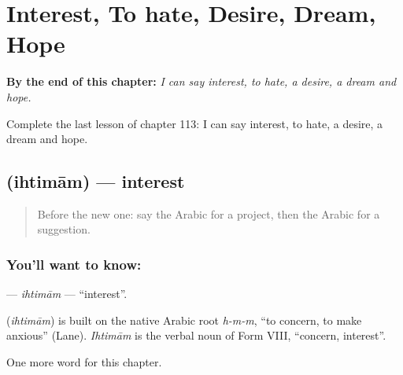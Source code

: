 
\chapter{Interest, To hate, Desire, Dream, Hope}
\label{ch:ar-interest-to-hate-desire-dream-hope}

\begin{chapteropening}
\textbf{By the end of this chapter:} \emph{I can say interest, to hate, a desire, a dream and hope.}

Complete the last lesson of chapter 113: I can say interest, to hate, a desire, a dream and hope.
\end{chapteropening}

\section[\texorpdfstring{\ar{اهتمام} (ihtimām)}{اهتمام (ihtimām)}]{ (ihtimām) — interest}

\label{lesson:AR-C113-ihtimam}



\begin{quote}
Before the new one: say the Arabic for a project, then the Arabic for a suggestion.
\end{quote}

\subsection*{You'll want to know: }
\textbf{} — \emph{ihtimām} — \textquotedblleft{}interest\textquotedblright{}.

\begin{cousinweb}
\textbf{} (\emph{ihtimām}) is built on the native Arabic root \emph{h-m-m}, \textquotedblleft{}to concern, to make anxious\textquotedblright{} (Lane). \emph{Ihtimām} is the verbal noun of Form VIII, \textquotedblleft{}concern, interest\textquotedblright{}.
\end{cousinweb}

\begin{grammarlens}[title={What you've built}]
One more word for this chapter.
\end{grammarlens}


